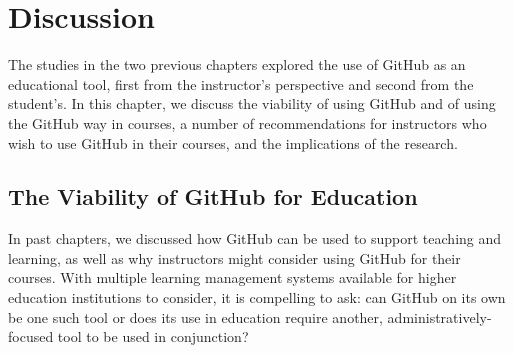 \chapter{Discussion}
The studies in the two previous chapters explored the use of GitHub as an educational tool, first from the instructor's perspective and second from the student's. In this chapter, we discuss the viability of using GitHub and of using the GitHub way in courses, a number of recommendations for instructors who wish to use GitHub in their courses, and the implications of the research.

\section{The Viability of GitHub for Education}
In past chapters, we discussed how GitHub can be used to support teaching and learning, as well as why instructors might consider using GitHub for their courses. With multiple learning management systems available for higher education institutions to consider, it is compelling to ask: can GitHub on its own be one such tool or does its use in education require another, administratively-focused tool to be used in conjunction?


